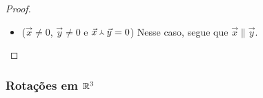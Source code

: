 \begin{proof}
\begin{enumerate}
\begin{itemize}
		\item ($\vec{x} \neq 0$, $\vec{y} \neq 0$ e ${\vec{x}} \Yup {\vec{y}}=0$) Nesse caso, segue que $\vec{x} \parallel \vec{y}$.
		\end{itemize}

\end{enumerate}
\end{proof}



\subsubsection{Rotações em \ensuremath{\R^3}}

